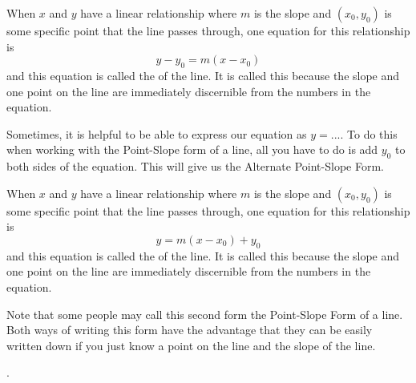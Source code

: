 \documentclass[nooutcomes]{ximera}
\begin{document}
\begin{definition}
When $x$ and  $y$ have a linear relationship where $m$ is the slope and $(x_0,y_0)$ is some specific point that the line passes through, one equation for this relationship is 
$$y-y_0=m(x-x_0)$$ 
and this equation is called the  of the line. It is called this because the slope and one point on the line are immediately discernible from the numbers in the equation.

\begin{image}
\end{image}

\end{definition}


Sometimes, it is helpful to be able to express our equation as $y=...$.  To do this when working with the Point-Slope form of a line, all you have to do is add $y_0$ to both sides of the equation.  This will give us the Alternate Point-Slope Form.  


\begin{definition}
When $x$ and  $y$ have a linear relationship where $m$ is the slope and $(x_0,y_0)$ is some specific point that the line passes through, one equation for this relationship is 
$$y=m(x-x_0)+y_0$$ 
and this equation is called the  of the line. It is called this because the slope and one point on the line are immediately discernible from the numbers in the equation.
\end{definition}


Note that some people may call this second form the Point-Slope Form of a line.  Both ways of writing this form have the advantage that they can be easily written down if you just know a point on the line and the slope of the line.

.

\end{document}
